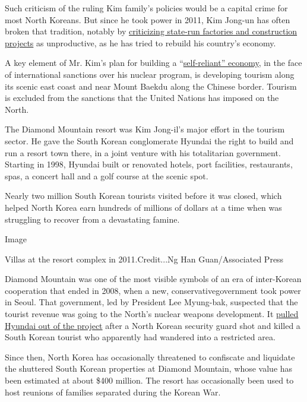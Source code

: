 Such criticism of the ruling Kim family's policies would be a capital
crime for most North Koreans. But since he took power in 2011, Kim
Jong-un ​has often broken that tradition, notably by
\href{https://www.nytimes3xbfgragh.onion/2018/08/20/world/asia/kim-jong-un-north-korea-economy-nuclear-talks.html}{criticizing
state-run factories and construction projects​} as unproductive, as he
has tried to rebuild his country's economy.

A key element of Mr. Kim's plan for building a
``\href{https://www.nytimes3xbfgragh.onion/2019/04/18/world/asia/north-korea-economy-sanctions.html}{self-reliant''
economy}, in the face of international sanctions over his nuclear
program, is developing tourism along its scenic east coast and near
Mount Baekdu along the Chinese border. Tourism is excluded from the
sanctions that the United Nations has imposed on the North.

The Diamond Mountain resort was Kim Jong-il's major effort in the
tourism sector. He gave the South Korean conglomerate Hyundai the right
to build and run a resort town there, in a joint venture with his
totalitarian government. Starting in 1998, Hyundai built or renovated
hotels, port facilities, restaurants, spas, ​a concert hall and a golf
course​ at the scenic spot​.

Nearly two million South Korean tourists visited before it was closed,
which helped North Korea earn ​hundreds of millions of dollars at a time
when was struggling to recover from a devastating famine.

Image

Villas at the resort complex in 2011.Credit...Ng Han Guan/Associated
Press

Diamond Mountain was one of the most visible symbols of an era of
inter-Korean cooperation that ended in 2008, when a new, conservative
​government​ took power​ in Seoul​. That government, led by President
Lee Myung-bak, suspected that the tourist revenue was going to the
North's nuclear weapons development. It
\href{https://www.nytimes3xbfgragh.onion/2008/08/11/world/asia/11iht-11korea.15158606.html}{pulled
Hyundai out of the project} after a North Korean security guard shot and
killed a South Korean tourist who apparently had wandered into a
restricted area.

Since then, North Korea has occasionally threatened to confiscate and
liquidate the shuttered South Korean properties at Diamond Mountain,
whose value has been estimated at about \$400 million​. The resort has
occasionally been used to host reunions of families separated during the
Korean War.

